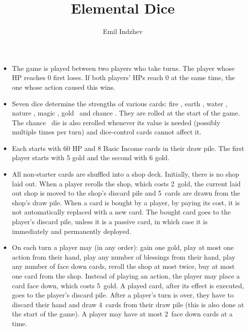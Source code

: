 \documentclass[dvipsnames,parskip,a4paper]{scrartcl}
\title{Elemental Dice}
\author{Emil Indzhev}
\newcommand{\iconsize}{3.4mm}
\newcommand{\icondepth}{0.45mm}
\newcommand{\icon}[1]{\raisebox{-\icondepth}{\texttt{[image:  \#1 ]}}}
\newcommand{\fire}{\icon{icons/fire.png}}
\newcommand{\earth}{\icon{icons/earth.png}}
\newcommand{\water}{\icon{icons/water.png}}
\newcommand{\nature}{\icon{icons/nature.png}}
\newcommand{\magic}{\icon{icons/magic.png}}
\newcommand{\gold}{\icon{icons/gold.png}}
\newcommand{\chance}{\icon{icons/chance.png}}
\newcommand{\rerollcost}{2}
\newcommand{\facedowncost}{5}
\newcommand{\handsize}{4}
\newcommand{\dacedownsize}{2}
\newcommand{\shopsize}{5}
\begin{document}
\maketitle

\begin{itemize}

\item

The game is played between two players who take turns. The player whose HP reaches 0 first loses. If both players' HPs reach 0 at the same time, the one whose action caused this wins.

\item

Seven dice determine the strengths of various cards: fire \fire, earth \earth, water \water, nature \nature, magic \magic, gold \gold \ and chance \chance. They are rolled at the start of the game. The chance \chance \ die is also rerolled whenever its value is needed (possibly multiple times per turn) and dice-control cards cannot affect it.

\item

Each starts with 60 HP and 8 Basic Income cards in their draw pile. The first player starts with 5 gold and the second with 6 gold.

\item

All non-starter cards are shuffled into a shop deck. Initially, there is no shop laid out. When a player rerolls the shop, which costs \rerollcost \ gold, the current laid out shop is moved to the shop's discard pile and \shopsize \ cards are drawn from the shop's draw pile. When a card is bought by a player, by paying its cost, it is not automatically replaced with a new card. The bought card goes to the player's discard pile, unless it is a passive card, in which case it is immediately and permanently deployed.

\item

On each turn a player may (in any order): gain one gold, play at most one action from their hand, play any number of blessings from their hand, play any number of face down cards, reroll the shop at most twice, buy at most one card from the shop. Instead of playing an action, the player may place a card face down, which costs \facedowncost \ gold. A played card, after its effect is executed, goes to the player's discard pile. After a player's turn is over, they have to discard their hand and draw \handsize \ cards from their draw pile (this is also done at the start of the game). A player may have at most \dacedownsize \ face down cards at a time.


\end{itemize}
\end{document}
